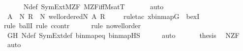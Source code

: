 \begin{isabellebody}
\ \ \ \ \isamarkupfalse%
\ N{\isacharunderscore}{\kern0pt}def\ SymExt{\isacharunderscore}{\kern0pt}M{\isacharunderscore}{\kern0pt}ZF\ M{\isacharunderscore}{\kern0pt}ZF{\isacharunderscore}{\kern0pt}iff{\isacharunderscore}{\kern0pt}M{\isacharunderscore}{\kern0pt}satT\ \isanewline
\ \ \ \ \isamarkupfalse%
\ auto\isanewline
\isanewline
\ \ \isamarkupfalse%
\ {\isachardoublequoteopen}{\isasymexists}A\ {\isasymin}\ N{\isachardot}{\kern0pt}\ {\isasymforall}R\ {\isasymin}\ N{\isachardot}{\kern0pt}\ {\isasymnot}wellordered{\isacharparenleft}{\kern0pt}{\isacharhash}{\kern0pt}{\isacharhash}{\kern0pt}N{\isacharcomma}{\kern0pt}\ A{\isacharcomma}{\kern0pt}\ R{\isacharparenright}{\kern0pt}{\isachardoublequoteclose}\isanewline
\ \ \ \ \isamarkupfalse%
{\isacharparenleft}{\kern0pt}rule{\isacharunderscore}{\kern0pt}tac\ x{\isacharequal}{\kern0pt}{\isachardoublequoteopen}binmap{\isacharparenleft}{\kern0pt}G{\isacharparenright}{\kern0pt}{\isachardoublequoteclose}\ \ bexI{\isacharparenright}{\kern0pt}\isanewline
\ \ \ \ \ \isamarkupfalse%
{\isacharparenleft}{\kern0pt}rule\ ballI{\isacharcomma}{\kern0pt}\ rule\ ccontr{\isacharparenright}{\kern0pt}\isanewline
\ \ \ \ \ \isamarkupfalse%
{\isacharparenleft}{\kern0pt}rule\ no{\isacharunderscore}{\kern0pt}wellorder{\isacharparenright}{\kern0pt}\isanewline
\ \ \ \ \isamarkupfalse%
\ GH\ N{\isacharunderscore}{\kern0pt}def\ SymExt{\isacharunderscore}{\kern0pt}def\ binmap{\isacharunderscore}{\kern0pt}eq\ binmap{\isacharprime}{\kern0pt}{\isacharunderscore}{\kern0pt}HS\isanewline
\ \ \ \ \isamarkupfalse%
\ auto\ \isanewline
\ \ \isamarkupfalse%
\ \isamarkupfalse%
\ {\isacharquery}{\kern0pt}thesis\ \isamarkupfalse%
\ N{\isacharunderscore}{\kern0pt}ZF\ \isamarkupfalse%
\ auto\isanewline
{}\isamarkupfalse%
%
\endisatagproof
{\isafoldproof}%
%
\isadelimproof
\isanewline
%
\endisadelimproof
\isanewline
\isanewline
%
\isadelimtheory
\isanewline
%
\endisadelimtheory
%
\isatagtheory
{}\isamarkupfalse%
%
\endisatagtheory
{\isafoldtheory}%
%
\isadelimtheory
%
\endisadelimtheory
%
\end{isabellebody}%
\endinput
